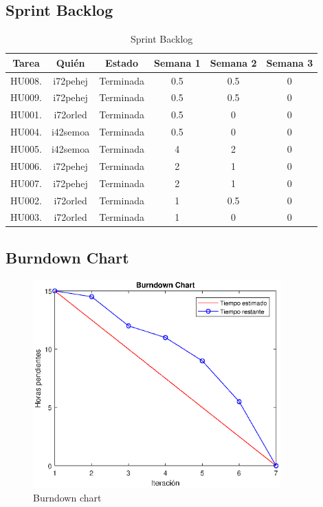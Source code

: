 \subsection{Sprint Backlog}
\begin{table}[h!]
	\centering
	\begin{tabular}{cccccc}
		\toprule
		\textbf{Tarea} & \textbf{Quién} & \textbf{Estado} & \textbf{Semana 1} & \textbf{Semana 2} & \textbf{Semana 3} \\
		\midrule
		HU008.	& i72pehej & Terminada & 0.5 & 0.5 & 0 \\
		HU009.	& i72pehej & Terminada & 0.5 & 0.5 & 0 \\
		HU001.	& i72orled & Terminada & 0.5 & 0 & 0 \\
		HU004.	& i42semoa & Terminada & 0.5 & 0 & 0 \\
		HU005.	& i42semoa & Terminada & 4 & 2 & 0 \\
		HU006.	& i72pehej & Terminada & 2 & 1 & 0 \\
		HU007.	& i72pehej & Terminada & 2 & 1 & 0 \\
		HU002.	& i72orled & Terminada & 1 & 0.5 & 0 \\
		HU003.	& i72orled & Terminada & 1 & 0 & 0 \\
		\bottomrule
\end{tabular}
\caption{\label{tab:sprint_backlog}Sprint Backlog}
\end{table}

\subsection{Burndown Chart}
\begin{figure}[h!]
	\centering
	\includegraphics[width=0.85\textwidth]{burndown_chart}
	\caption{Burndown chart}
	\label{fig:burndown_chart}
\end{figure}


